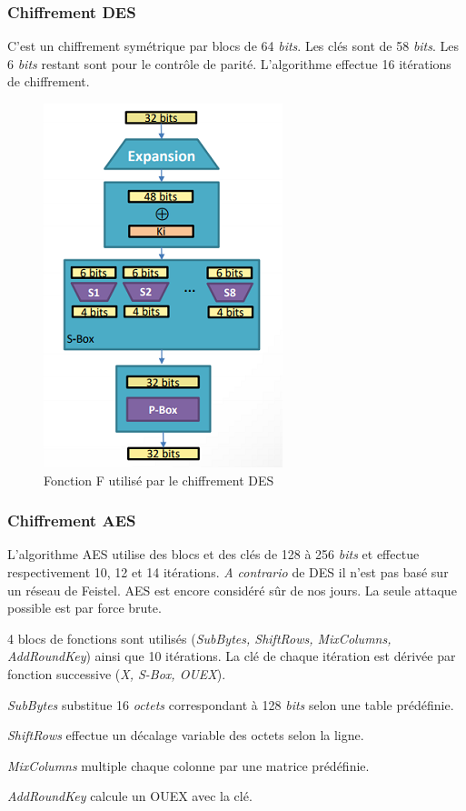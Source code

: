 \documentclass[12pt, a4paper]{article}
\begin{document}
	\subsubsection{Chiffrement DES}
	C'est un chiffrement symétrique par blocs de 64 \textit{bits}. Les clés sont de 58 \textit{bits}. Les 6 \textit{bits} restant sont pour le contrôle de parité. L'algorithme effectue 16 itérations de chiffrement.
	\begin{figure}[!ht]
		\centering
		\includegraphics{images/des}
		\caption{Fonction F utilisé par le chiffrement DES}
		\label{fig:des}
	\end{figure}
	\subsubsection{Chiffrement AES}
	L'algorithme AES utilise des blocs et des clés de 128 à 256 \textit{bits} et effectue respectivement 10, 12 et 14 itérations. \textit{A contrario} de DES il n'est pas basé sur un réseau de Feistel. AES est encore considéré sûr de nos jours. La seule attaque possible est par force brute.
	\par
	4 blocs de fonctions sont utilisés (\textit{SubBytes, ShiftRows, MixColumns, AddRoundKey}) ainsi que 10 itérations. La clé de chaque itération est dérivée par fonction successive (\textit{X, S-Box, OUEX}).
	\par
	\textit{SubBytes} substitue 16 \textit{octets} correspondant à 128 \textit{bits} selon une table prédéfinie.
	\par
	\textit{ShiftRows} effectue un décalage variable des octets selon la ligne.
	\par
	\textit{MixColumns} multiple chaque colonne par une matrice prédéfinie.
	\par
	\textit{AddRoundKey} calcule un OUEX avec la clé.
\end{document}
